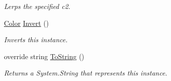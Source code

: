 \begin{DoxyCompactItemize}
\begin{DoxyCompactList}\small\item\em Lerps the specified c2. \end{DoxyCompactList}\item 
\hyperlink{struct_lerp2_a_p_i_1_1_optimizers_1_1_color}{Color} \hyperlink{struct_lerp2_a_p_i_1_1_optimizers_1_1_color_a20f2915a5d0b55c84d5ef18e9253ae6b}{Invert} ()
\begin{DoxyCompactList}\small\item\em Inverts this instance. \end{DoxyCompactList}\item 
override string \hyperlink{struct_lerp2_a_p_i_1_1_optimizers_1_1_color_ad003a5f4b2d92f5d5f64b5047c315aa3}{To\+String} ()
\begin{DoxyCompactList}\small\item\em Returns a System.\+String that represents this instance. \end{DoxyCompactList}\end{DoxyCompactItemize}
